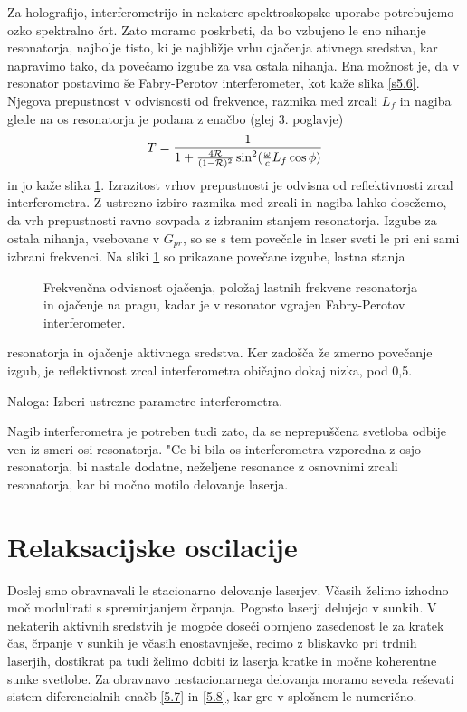 Za holografijo, interferometrijo in nekatere spektroskopske uporabe
potrebujemo ozko spektralno črt. Zato moramo poskrbeti, da bo vzbujeno le
eno nihanje resonatorja, najbolje tisto, ki je najbližje vrhu ojačenja
ativnega sredstva, kar napravimo tako, da povečamo izgube za vsa ostala
nihanja. Ena možnost je, da v resonator postavimo še Fabry-Perotov
interferometer, kot kaže slika \ref{s5.6}. Njegova prepustnost v
odvisnosti od frekvence, razmika med zrcali $L_{f}$ in nagiba glede na os
resonatorja je podana z enačbo (glej 3. poglavje) 
\begin{equation}
T=\frac{1}{1+\frac{4{\cal {R}}}{(1-{\cal {R}})^{2}}\sin ^{2}(\frac{\omega }{c%
}L_{f}\cos \phi )}  \label{5.22}
\end{equation}
in jo kaže slika \ref{s5.7}. Izrazitost vrhov prepustnosti je odvisna od
reflektivnosti zrcal interferometra. Z ustrezno izbiro razmika med zrcali in
nagiba lahko dosežemo, da vrh prepustnosti ravno sovpada z izbranim
stanjem resonatorja. Izgube za ostala nihanja, vsebovane v $G_{pr}$, so se s
tem povečale in laser sveti le pri eni sami izbrani frekvenci. Na sliki 
\ref{s5.7} so prikazane povečane izgube, lastna stanja 
\begin{figure}[tbp]
\label{s5.7} \vskip 7cm
\caption{Frekvenčna odvisnost ojačenja, položaj lastnih frekvenc
resonatorja in ojačenje na pragu, kadar je v resonator vgrajen
Fabry-Perotov interferometer.}
\end{figure}
resonatorja in ojačenje aktivnega sredstva. Ker zadošča že zmerno
povečanje izgub, je reflektivnost zrcal interferometra običajno dokaj
nizka, pod 0,5.

Naloga: Izberi ustrezne parametre interferometra.

Nagib interferometra je potreben tudi zato, da se neprepuščena svetloba
odbije ven iz smeri osi resonatorja. "Ce bi bila os interferometra vzporedna
z osjo resonatorja, bi nastale dodatne, neželjene resonance z osnovnimi
zrcali resonatorja, kar bi močno motilo delovanje laserja.

\section{Relaksacijske oscilacije}

Doslej smo obravnavali le stacionarno delovanje laserjev. Včasih želimo
izhodno moč modulirati s spreminjanjem črpanja. Pogosto laserji delujejo v
sunkih. V nekaterih aktivnih sredstvih je mogoče doseči obrnjeno
zasedenost le za kratek čas, črpanje v sunkih je včasih enostavnješe,
recimo z bliskavko pri trdnih laserjih, dostikrat pa tudi želimo dobiti iz
laserja kratke in močne koherentne sunke svetlobe. Za obravnavo
nestacionarnega delovanja moramo seveda reševati sistem diferencialnih
enačb \ref{5.7} in \ref{5.8}, kar gre v splošnem le numerično.

